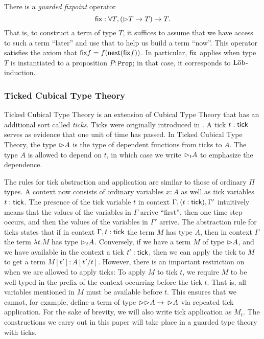 
There is a \emph{guarded fixpoint} operator
\[ \mathsf{fix} : \forall T, ({\vartriangleright} T \to T) \to T. \]
That is, to construct a term of type $T$, it suffices to assume that we have
access to such a term ``later'' and use that to help us build a term ``now''.
This operator satisfies the axiom that $\mathsf{fix} f = f (\mathsf{next} (\mathsf{fix} f))$.
%
In particular, $\mathsf{fix}$ applies when type $T$ is instantiated to a proposition 
$P : \texttt{Prop}$; in that case, it corresponds to $\text{L\"{o}b}$-induction.

\subsubsection{Ticked Cubical Type Theory}

Ticked Cubical Type Theory \cite{mogelberg-veltri2019} is an extension of
Cubical Type Theory \cite{CohenCoquandHuberMortberg2017} that has an additional
sort called \emph{ticks}. Ticks were originally introduced in
\cite{bahr-grathwohl-bugge-mogelberg2017}. A tick $t : \mathsf{tick}$ serves as evidence
that one unit of time has passed. In Ticked Cubical Type Theory, the type
${\vartriangleright} A$ is the type of dependent functions from ticks to $A$. The type $A$ is
allowed to depend on $t$, in which case we write ${\vartriangleright}_t A$ to emphasize the
dependence.



The rules for tick abstraction and application are similar to those of ordinary
$\Pi$ types. A context now consists of ordinary variables $x : A$ as well as
tick variables $t : \mathsf{tick}$. The presence of the tick variable $t$ in context
$\Gamma, (t : \mathsf{tick}), \Gamma'$ intuitively means that the values of the
variables in $\Gamma$ arrive ``first'', then one time step occurs, and then the
values of the variables in $\Gamma'$ arrive.
%
The abstraction rule for ticks states that if in context $\Gamma, t : \mathsf{tick}$
the term $M$ has type $A$, then in context $\Gamma$ the term $\lambda t.M$ has
type ${\vartriangleright}_t A$.
%
Conversely, if we have a term $M$ of type ${\vartriangleright} A$, and we have available in
the context a tick $t' : \mathsf{tick}$, then we can apply the tick to $M$ to get a
term $M[t'] : A[t'/t]$. However, there is an important restriction on when we
are allowed to apply ticks: To apply $M$ to tick $t$, we require $M$ to be
well-typed in the prefix of the context occurring before the tick $t$. That is,
all variables mentioned in $M$ must be available before $t$. This ensures that
we cannot, for example, define a term of type ${\vartriangleright} {{\vartriangleright}} A \to\, {{\vartriangleright}}
A$ via repeated tick application.
%
For the sake of brevity, we will also write tick application as $M_t$.
The constructions we carry out in this paper will take place in a guarded type
theory with ticks.
